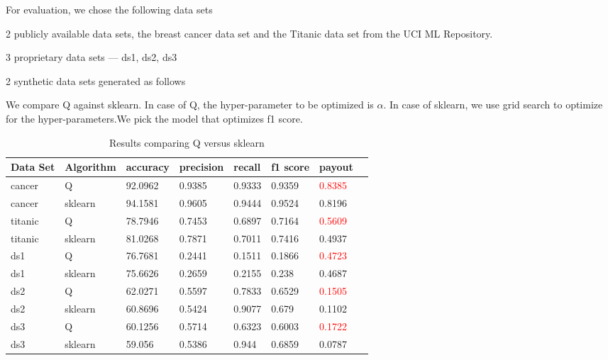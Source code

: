 For evaluation, we chose the following data sets
\be
\item 2 publicly available data sets, the breast cancer data set and the
Titanic data set from the UCI ML Repository.
\item 3 proprietary data sets --- ds1, ds2, ds3
\item 2 synthetic data sets generated as follows
\be
\item \TBC
\item \TBC
\ee
\ee

We compare Q against sklearn. 
In case of Q, the hyper-parameter to be optimized is \(\alpha\). 
In case of sklearn, we use grid search to optimize for the hyper-parameters.We
pick the model that optimizes f1 score. 

\begin{table}
\centering
\begin{tabular}{|l||l|l|l|l|l|l|l|} \hline \hline
{\bf Data Set} & {\bf Algorithm} & {\bf accuracy} & {\bf precision} & {\bf recall} & {\bf f1 score} & {\bf payout} \\ \hline \hline    
cancer & Q &      92.0962 & 0.9385 &  0.9333 &  0.9359 &  \textcolor{red}{0.8385} \\ \hline
cancer & sklearn & 94.1581 & 0.9605 &  0.9444 &  0.9524 &  0.8196 \\ \hline
\hline                                        
titanic & Q &      78.7946 & 0.7453 &  0.6897 &  0.7164 &  \textcolor{red}{0.5609} \\ \hline
titanic & sklearn &       81.0268 & 0.7871 &  0.7011 &  0.7416 &  0.4937 \\ \hline
\hline                                        
ds1 & Q &    76.7681 &0.2441  &0.1511  & 0.1866  & \textcolor{red}{0.4723} \\ \hline
ds1 &  sklearn &     75.6626 & 0.2659 &  0.2155 &  0.238 &   0.4687 \\ \hline
\hline                                        
ds2 & Q &     62.0271 & 0.5597 &  0.7833 &  0.6529 &  \textcolor{red}{0.1505} \\ \hline
ds2 & sklearn &     60.8696 & 0.5424 &  0.9077 &  0.679 &   0.1102 \\ \hline
\hline                                        
ds3 & Q &   60.1256 & 0.5714 &  0.6323 &  0.6003 &  \textcolor{red}{0.1722} \\ \hline
ds3 & sklearn &   59.056 &  0.5386 &  0.944 &   0.6859 &  0.0787 \\ \hline
\hline
\end{tabular}
\label{tbl_results}
\caption{Results comparing Q versus sklearn}
\end{table}


